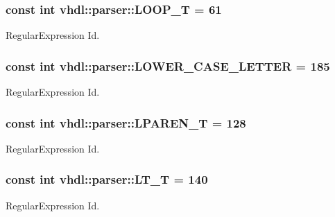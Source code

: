 \subsubsection[{L\+O\+O\+P\+\_\+\+T}]{\setlength{\rightskip}{0pt plus 5cm}const int vhdl\+::parser\+::\+L\+O\+O\+P\+\_\+\+T = 61}\label{namespacevhdl_1_1parser_aa3842495592970f3c62fb7e7c2af11e4}
Regular\+Expression Id. \hypertarget{namespacevhdl_1_1parser_a1b68252e0a1af5290f78760d32b923cb}{}
\subsubsection[{L\+O\+W\+E\+R\+\_\+\+C\+A\+S\+E\+\_\+\+L\+E\+T\+T\+E\+R}]{\setlength{\rightskip}{0pt plus 5cm}const int vhdl\+::parser\+::\+L\+O\+W\+E\+R\+\_\+\+C\+A\+S\+E\+\_\+\+L\+E\+T\+T\+E\+R = 185}\label{namespacevhdl_1_1parser_a1b68252e0a1af5290f78760d32b923cb}
Regular\+Expression Id. \hypertarget{namespacevhdl_1_1parser_a071b5fedef900d209311c212881c3269}{}
\subsubsection[{L\+P\+A\+R\+E\+N\+\_\+\+T}]{\setlength{\rightskip}{0pt plus 5cm}const int vhdl\+::parser\+::\+L\+P\+A\+R\+E\+N\+\_\+\+T = 128}\label{namespacevhdl_1_1parser_a071b5fedef900d209311c212881c3269}
Regular\+Expression Id. \hypertarget{namespacevhdl_1_1parser_a9624206b569e04de519e1e1c9a4de441}{}
\subsubsection[{L\+T\+\_\+\+T}]{\setlength{\rightskip}{0pt plus 5cm}const int vhdl\+::parser\+::\+L\+T\+\_\+\+T = 140}\label{namespacevhdl_1_1parser_a9624206b569e04de519e1e1c9a4de441}
Regular\+Expression Id. \hypertarget{namespacevhdl_1_1parser_a088fd9837c0b04dd800147e52decfcba}{}
